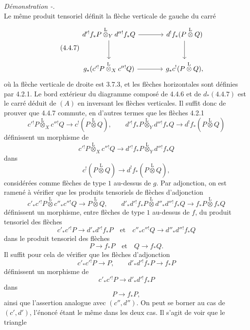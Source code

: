 \documentclass[11pt]{article}
\newenvironment{prooftext}[1][Proof]{\par\noindent\emph{#1.}\ }{\par\medskip}
\begin{document}
\begin{prooftext}[Démonstration -]
\[\]
Le même produit tensoriel définit la flèche verticale de gauche du carré
\begin{equation}
\tag{4.4.7}
\begin{tikzcd}[column sep=large,row sep=large]
d'{}^!f_*P\overset{\mathrm{L}}{\otimes}_Yd''{}^!f_*Q
 \arrow[r]\arrow[d] &
d^!f_*(P\overset{\mathrm{L}}{\otimes}Q)\arrow[d]\\
g_*(c'{}^!P\overset{\mathrm{L}}{\otimes}_Xc''{}^!Q)
 \arrow[r] &
g_*c^!(P\overset{\mathrm{L}}{\otimes}Q),
\end{tikzcd}
\end{equation}
où la flèche verticale de droite est 3.7.3, et les flèches horizontales sont définies par 4.2.1. Le bord extérieur du diagramme composé de 4.4.6 et de $d_*(4.4.7)$ est le carré déduit de $(A)$ en inversant les flèches verticales. Il suffit donc de prouver que 4.4.7 commute, en d'autres termes que les flèches 4.2.1
\[
c'{}^!P\overset{\mathrm{L}}{\otimes}_Xc''{}^!Q\longrightarrow c^!(P\overset{\mathrm{L}}{\otimes}Q),\qquad
d'{}^!f_*P\overset{\mathrm{L}}{\otimes}_Yd''{}^!f_*Q\longrightarrow d^!f_*(P\overset{\mathrm{L}}{\otimes}Q)
\]
définissent un morphisme de
\[
c'{}^!P\overset{\mathrm{L}}{\otimes}_Xc''{}^!Q\longrightarrow d'{}^!f_*P\overset{\mathrm{L}}{\otimes}_Yd''{}^!f_*Q
\]
dans
\[
c^!(P\overset{\mathrm{L}}{\otimes}Q)\longrightarrow d^!f_*(P\overset{\mathrm{L}}{\otimes}Q),
\]
considérées comme flèches de type $1$ au-dessus de $g$. Par adjonction, on est ramené à vérifier que les produits tensoriels de flèches d'adjonction
\[
c'_*c'{}^!P\overset{\mathrm{L}}{\otimes}c''_*c''{}^!Q\longrightarrow P\overset{\mathrm{L}}{\otimes}Q,
\qquad
d'_*d'{}^!f_*P\overset{\mathrm{L}}{\otimes}d''_*d''{}^!f_*Q
\longrightarrow f_*P\overset{\mathrm{L}}{\otimes}f_*Q
\]
définissent un morphisme, entre flèches de type $1$ au-dessus de $f$, du produit tensoriel des flèches
\[
c'_*c'{}^!P\longrightarrow d'_*d'{}^!f_*P\quad\text{et}\quad
c''_*c''{}^!Q\longrightarrow d''_*d''{}^!f_*Q
\]
dans le produit tensoriel des flèches
\[
P\longrightarrow f_*P\quad\text{et}\quad Q\longrightarrow f_*Q.
\]
Il suffit pour cela de vérifier que les flèches d'adjonction
\[
c'_*c'{}^!P\longrightarrow P,\qquad d'_*d'{}^!f_*P\longrightarrow f_*P
\]
définissent un morphisme de
\[
c'_*c'{}^!P\longrightarrow d'_*d'{}^!f_*P
\]
dans
\[
P\longrightarrow f_*P,
\]
ainsi que l'assertion analogue
avec $(c'',d'')$. On peut se borner au cas de $(c',d')$, l'énoncé étant le même dans les deux cas. Il s'agit de voir que le triangle
\[
\begin{tikzcd}[column sep=large,row sep=large]

\end{tikzcd}\]
\end{prooftext}
\end{document}
